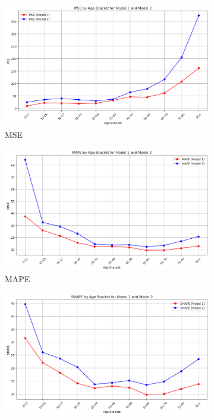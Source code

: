 \documentclass{article}
\begin{document}
\begin{figure}[ht]
    \centering
    \begin{subfigure}{0.32\textwidth}
        \centering
        \includegraphics[width=\textwidth]{images/4_MSE.png}
        \caption{MSE}
        \label{fig:mse}
    \end{subfigure}
    \hfill
    \begin{subfigure}{0.32\textwidth}
        \centering
        \includegraphics[width=\textwidth]{images/4_MAPE.png}
        \caption{MAPE}
        \label{fig:mape}
    \end{subfigure}
    \hfill
    \begin{subfigure}{0.32\textwidth}
        \centering
        \includegraphics[width=\textwidth]{images/4_SMAPE.png}

\end{subfigure}
\end{figure}
\end{document}
